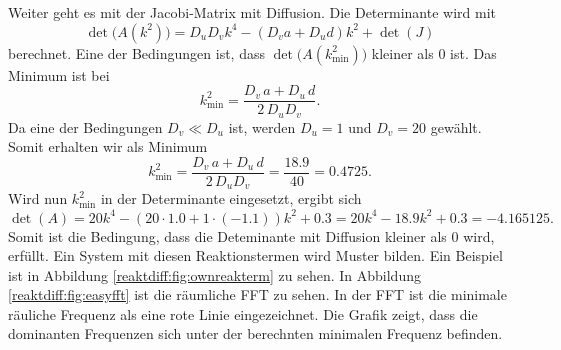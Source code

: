 Weiter geht es mit der Jacobi-Matrix mit Diffusion.
Die Determinante wird mit
\begin{equation*}
    \det\bigl(A(k^2)\bigr) = D_u D_v k^4 - (D_v a + D_u d) k^2 + \det(J)
\end{equation*}
berechnet.
Eine der Bedingungen ist, dass \( \det\bigl( A(k_{\min}^2)\bigr)\) kleiner als 0 ist.
Das Minimum ist bei
\begin{equation*}
    k^2_{\text{min}} = \frac{D_v\, a + D_u \, d}{2\, D_u D_v}.
\end{equation*}
Da eine der Bedingungen \(D_v \ll D_u\) ist, werden \(D_u = 1\) und \(D_v = 20\) gewählt.
Somit erhalten wir als Minimum
\begin{equation*}
    k^2_{\text{min}} = \frac{D_v\, a + D_u\, d}{2\, D_u D_v} = \frac{18.9}{40} = 0.4725.
\end{equation*}
Wird nun \(k^2_{\text{min}}\) in der Determinante eingesetzt, ergibt sich
\begin{equation*}
    \det(A) = 20k^4 - (20 \cdot 1.0 + 1 \cdot (-1.1))k^2 + 0.3 = 20k^4 - 18.9k^2 + 0.3
     = -4.165125 .
\end{equation*}
Somit ist die Bedingung, dass die Deteminante mit Diffusion kleiner als 0 wird, erfüllt.
Ein System mit diesen Reaktionstermen wird Muster bilden.
Ein Beispiel ist in Abbildung \ref{reaktdiff:fig:ownreakterm} zu sehen.
In Abbildung \ref{reaktdiff:fig:easyfft} ist die räumliche FFT zu sehen.
In der FFT ist die minimale räuliche Frequenz als eine rote Linie eingezeichnet.
Die Grafik zeigt, dass die dominanten Frequenzen sich unter der berechnten minimalen Frequenz befinden.





